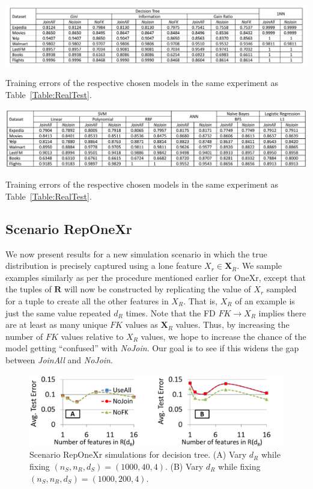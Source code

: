 \documentclass{vldb}
\begin{document}
\begin{table}
\centering
\includegraphics[width=2\columnwidth]{table3-1.pdf}
\caption{Training errors of the respective chosen models in the same experiment as Table~\ref{Table:RealTest}.}
\label{Table:RealTrain}
\end{table}

\begin{table}
\centering
\includegraphics[width=2\columnwidth]{table3-2.pdf}
\caption{Training errors of the respective chosen models in the same experiment as Table~\ref{Table:RealTest}.}
\label{Table:RealTrain}
\end{table}

\subsection{Scenario RepOneXr}
We now present results for a new simulation scenario in which the true distribution is precisely captured using a lone feature $X_r \in \textbf{X}_R$. We sample examples similarly as per the procedure mentioned earlier for OneXr, except that the tuples of $\textbf{R}$ will now be constructed by replicating the value of $X_r$ sampled for a tuple to create all the other features in $X_R$. That is, $X_R$ of an example is just the same value repeated $d_R$ times. Note that the FD $\textit{FK} \rightarrow X_R $ implies there are at least as many unique $FK$ values as $\textbf{X}_R$ values. Thus, by increasing the number of $FK$ values relative to $X_R$ values, we hope to increase the chance of the model getting ``confused'' with \textit{NoJoin}. Our goal is to see if this widens the gap between \textit{JoinAll} and \textit{NoJoin}.

\begin{figure}[h]
\centering
\includegraphics[width=0.99\linewidth]{onexr_jerrydt.pdf}
\caption{Scenario RepOneXr simulations for decision tree. (A) Vary $d_R$ while fixing $(n_S, n_R, d_S) = (1000, 40, 4)$. (B) Vary $d_R$ while fixing $(n_S, n_R, d_S) = (1000, 200, 4)$.}
\label{Figure:OneXrjerry_dt}
\end{figure}
\end{document}
